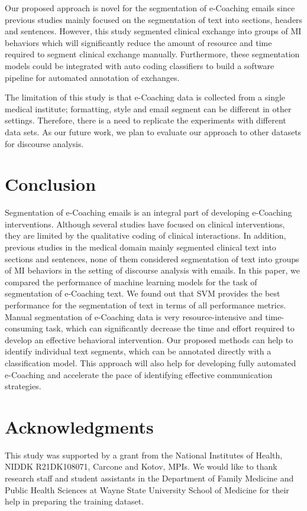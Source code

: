\documentclass{amia}
\begin{document}
Our proposed approach is novel for the segmentation of e-Coaching emails since previous studies mainly focused on the segmentation of text into sections, headers and sentences. However, this study segmented clinical exchange into groups of MI behaviors which will significantly reduce the amount of resource and time required to segment clinical exchange manually. Furthermore, these segmentation models could be integrated with auto coding classifiers to build a software pipeline for automated annotation of exchanges.

The limitation of this study is that e-Coaching data is collected from a single medical institute; formatting, style and email segment can be different in other settings. Therefore, there is a need to replicate the experiments with different data sets. As our future work, we plan to evaluate our approach to other datasets for discourse analysis. 

 
\section*{Conclusion}
Segmentation of e-Coaching emails is an integral part of developing e-Coaching interventions. Although several studies have focused on clinical interventions, they are limited by the qualitative coding of clinical interactions. In addition, previous studies in the medical domain mainly segmented clinical text into sections and sentences, none of them considered segmentation of text into groups of MI behaviors in the setting of discourse analysis with emails. In this paper, we compared the performance of machine learning models for the task of segmentation of e-Coaching text. We found out that SVM provides the best performance for the segmentation of text in terms of all performance metrics. Manual segmentation of e-Coaching data is very resource-intensive and time-consuming task, which can significantly decrease the time and effort required to develop an effective behavioral intervention. Our proposed methods can help to identify individual text segments, which can be annotated directly with a classification model. This approach will also help for developing fully automated e-Coaching and accelerate the pace of identifying effective communication strategies.

\section*{Acknowledgments}
This study was supported by a grant from the National Institutes of Health, NIDDK R21DK108071, Carcone and Kotov, MPIs. We would like to thank research staff and student assistants in the Department of Family Medicine and Public Health Sciences at Wayne State University School of Medicine for their help in preparing the training dataset. 



\end{document}
